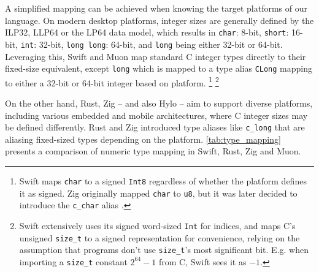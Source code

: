 A simplified mapping can be achieved when knowing the target platforms of our language. On modern desktop platforms, integer sizes are generally defined by the ILP32, LLP64 or the LP64 data model, which results in \texttt{char}: 8-bit, \texttt{short}: 16-bit, \texttt{int}: 32-bit, \texttt{long long}: 64-bit, and \texttt{long} being either 32-bit or 64-bit. Leveraging this, Swift and Muon map standard C integer types directly to their fixed-size equivalent, except \texttt{long} which is mapped to a type alias \texttt{CLong} mapping to either a 32-bit or 64-bit integer based on platform.
\footnote{
    Swift maps \texttt{char} to a signed \texttt{Int8} regardless of whether the platform defines it as signed. Zig originally mapped \texttt{char} to \texttt{u8}, but it was later decided to introduce the \texttt{c\_char} alias \cite{zig-add-cchar}.
}
\footnote{
    Swift extensively uses its signed word-sized \texttt{Int} for indices, and maps C's unsigned \texttt{size\_t} to a signed representation for convenience, relying on the assumption that programs don't use \texttt{size\_t}'s most significant bit. E.g. when importing a \texttt{size\_t} constant $2^{64} -1$ from C, Swift sees it as $-1$.
}



On the other hand, Rust, Zig -- and also Hylo -- aim to support diverse platforms, including various embedded and mobile architectures, where C integer sizes may be defined differently. Rust and Zig introduced type aliases like \texttt{c\_long} that are aliasing fixed-sized types depending on the platform. \autoref{tab:type_mapping} presents a comparison of numeric type mapping in Swift, Rust, Zig and Muon. 



